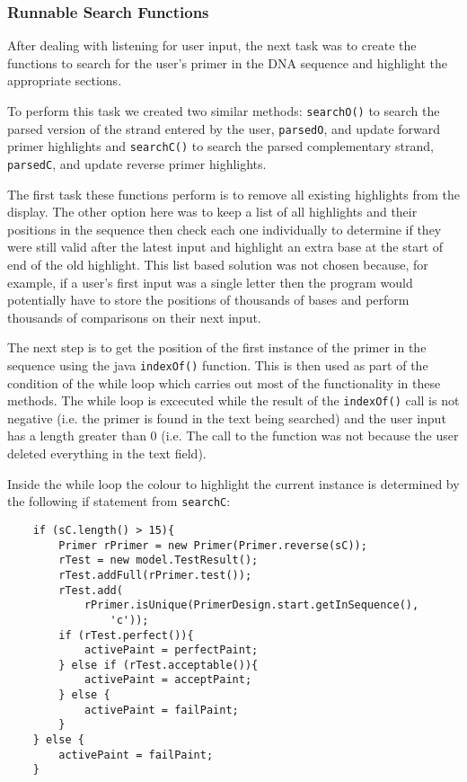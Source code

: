 \subsubsection{Runnable Search Functions}

After dealing with listening for user input, the next task was to create
the functions to search for the user's primer in the DNA sequence and
highlight the appropriate sections.

To perform this task we created two similar methods: \texttt{searchO()}
to search the parsed version of the strand entered by the user,
\texttt{parsedO}, and update forward primer highlights and
\texttt{searchC()} to search the parsed complementary strand,
\texttt{parsedC}, and update reverse primer highlights.

The first task these functions perform is to remove all existing
highlights from the display. The other option here was to keep a list of
all highlights and their positions in the sequence then check each one
individually to determine if they were still valid after the latest
input and highlight an extra base at the start of end of the old
highlight. This list based solution was not chosen because, for example,
if a user's first input was a single letter then the program would
potentially have to store the positions of thousands of bases and
perform thousands of comparisons on their next input.

The next step is to get the position of the first instance of the primer
in the sequence using the java \texttt{indexOf()} function. This is then
used as part of the condition of the while loop which carries out most
of the functionality in these methods. The while loop is excecuted while
the result of the \texttt{indexOf()} call is not negative (i.e. the
primer is found in the text being searched) and the user input has a
length greater than 0 (i.e. The call to the function was not because the
user deleted everything in the text field).

Inside the while loop the colour to highlight the current instance is
determined by the following if statement from \texttt{searchC}:

\begin{lstlisting}
    if (sC.length() > 15){
        Primer rPrimer = new Primer(Primer.reverse(sC));
        rTest = new model.TestResult();
        rTest.addFull(rPrimer.test());
        rTest.add(
            rPrimer.isUnique(PrimerDesign.start.getInSequence(),
                'c'));
        if (rTest.perfect()){
            activePaint = perfectPaint;
        } else if (rTest.acceptable()){
            activePaint = acceptPaint;
        } else {
            activePaint = failPaint;
        }
    } else {
        activePaint = failPaint;
    } 
\end{lstlisting}


